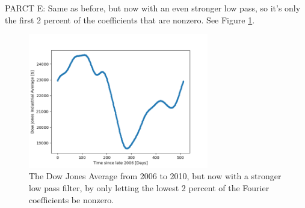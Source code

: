 \documentclass[11pt]{article}
\begin{document}
PARCT E: Same as before, but now with an even stronger low pass, so it's only the first 2 percent of the coefficients that are nonzero. See Figure \ref{v high}.
\begin{figure}[!htbp]
    \centering
    \includegraphics[width=0.7\textwidth]{v_high_cut.png}
    \caption{The Dow Jones Average from 2006 to 2010, but now with a stronger low pass filter, by only letting the lowest 2 percent of the Fourier coefficients be nonzero. }
    \label{v high}
\end{figure}
\end{document}
